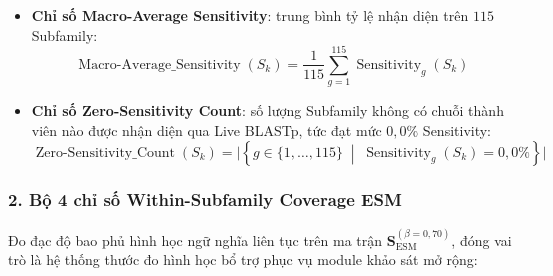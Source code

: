 \begin{itemize}
    \item \textbf{Chỉ số Macro-Average Sensitivity}: trung bình tỷ lệ nhận diện trên $115$ Subfamily:
    \begin{equation}
    \label{eq:macro_sens_formula}
    \operatorname{Macro\text{-}Average\_Sensitivity}(S_k) = \frac{1}{115} \sum_{g=1}^{115} \operatorname{Sensitivity}_g(S_k)
    \end{equation}
    
    \item \textbf{Chỉ số Zero-Sensitivity Count}: số lượng Subfamily không có chuỗi thành viên nào được nhận diện qua Live BLASTp, tức đạt mức $0{,}0\%$ Sensitivity:
    \begin{equation}
    \operatorname{Zero\text{-}Sensitivity\_Count}(S_k) = \Big|\left\{g \in \{1, \dots, 115\} \;\middle|\; \operatorname{Sensitivity}_g(S_k) = 0{,}0\%\right\}\Big|
    \end{equation}
\end{itemize}

\subsubsection{2. Bộ 4 chỉ số Within-Subfamily Coverage ESM}
Đo đạc độ bao phủ hình học ngữ nghĩa liên tục trên ma trận $\mathbf{S}_{\text{ESM}}^{(\beta=0{,}70)}$, đóng vai trò là hệ thống thước đo hình học bổ trợ phục vụ module khảo sát mở rộng:

